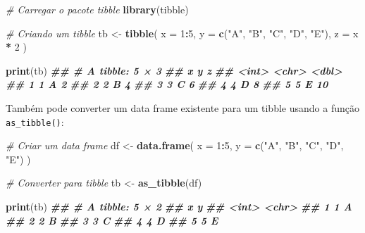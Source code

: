 \documentclass[
]{book}
\newenvironment{Shaded}{\begin{snugshade}}{\end{snugshade}}
\newcommand{\AttributeTok}[1]{\textcolor[rgb]{0.13,0.29,0.53}{#1}}
\newcommand{\CommentTok}[1]{\textcolor[rgb]{0.56,0.35,0.01}{\textit{#1}}}
\newcommand{\DecValTok}[1]{\textcolor[rgb]{0.00,0.00,0.81}{#1}}
\newcommand{\DocumentationTok}[1]{\textcolor[rgb]{0.56,0.35,0.01}{\textbf{\textit{#1}}}}
\newcommand{\FunctionTok}[1]{\textcolor[rgb]{0.13,0.29,0.53}{\textbf{#1}}}
\newcommand{\NormalTok}[1]{#1}
\newcommand{\OtherTok}[1]{\textcolor[rgb]{0.56,0.35,0.01}{#1}}
\newcommand{\SpecialCharTok}[1]{\textcolor[rgb]{0.81,0.36,0.00}{\textbf{#1}}}
\newcommand{\StringTok}[1]{\textcolor[rgb]{0.31,0.60,0.02}{#1}}
\begin{document}
\begin{Shaded}
\begin{Highlighting}[]
\CommentTok{\# Carregar o pacote tibble}
\FunctionTok{library}\NormalTok{(tibble)}

\CommentTok{\# Criando um tibble}
\NormalTok{tb }\OtherTok{\textless{}{-}} \FunctionTok{tibble}\NormalTok{(}
  \AttributeTok{x =} \DecValTok{1}\SpecialCharTok{:}\DecValTok{5}\NormalTok{,}
  \AttributeTok{y =} \FunctionTok{c}\NormalTok{(}\StringTok{"A"}\NormalTok{, }\StringTok{"B"}\NormalTok{, }\StringTok{"C"}\NormalTok{, }\StringTok{"D"}\NormalTok{, }\StringTok{"E"}\NormalTok{),}
  \AttributeTok{z =}\NormalTok{ x }\SpecialCharTok{*} \DecValTok{2}
\NormalTok{)}

\FunctionTok{print}\NormalTok{(tb)}
\DocumentationTok{\#\# \# A tibble: 5 × 3}
\DocumentationTok{\#\#       x y         z}
\DocumentationTok{\#\#   \textless{}int\textgreater{} \textless{}chr\textgreater{} \textless{}dbl\textgreater{}}
\DocumentationTok{\#\# 1     1 A         2}
\DocumentationTok{\#\# 2     2 B         4}
\DocumentationTok{\#\# 3     3 C         6}
\DocumentationTok{\#\# 4     4 D         8}
\DocumentationTok{\#\# 5     5 E        10}
\end{Highlighting}
\end{Shaded}

Também pode converter um data frame existente para um tibble usando a
função \texttt{as\_tibble()}:

\begin{Shaded}
\begin{Highlighting}[]
\CommentTok{\# Criar um data frame}
\NormalTok{df }\OtherTok{\textless{}{-}} \FunctionTok{data.frame}\NormalTok{(}
  \AttributeTok{x =} \DecValTok{1}\SpecialCharTok{:}\DecValTok{5}\NormalTok{,}
  \AttributeTok{y =} \FunctionTok{c}\NormalTok{(}\StringTok{"A"}\NormalTok{, }\StringTok{"B"}\NormalTok{, }\StringTok{"C"}\NormalTok{, }\StringTok{"D"}\NormalTok{, }\StringTok{"E"}\NormalTok{)}
\NormalTok{)}

\CommentTok{\# Converter para tibble}
\NormalTok{tb }\OtherTok{\textless{}{-}} \FunctionTok{as\_tibble}\NormalTok{(df)}

\FunctionTok{print}\NormalTok{(tb)}
\DocumentationTok{\#\# \# A tibble: 5 × 2}
\DocumentationTok{\#\#       x y    }
\DocumentationTok{\#\#   \textless{}int\textgreater{} \textless{}chr\textgreater{}}
\DocumentationTok{\#\# 1     1 A    }
\DocumentationTok{\#\# 2     2 B    }
\DocumentationTok{\#\# 3     3 C    }
\DocumentationTok{\#\# 4     4 D    }
\DocumentationTok{\#\# 5     5 E}
\end{Highlighting}
\end{Shaded}
\end{document}
